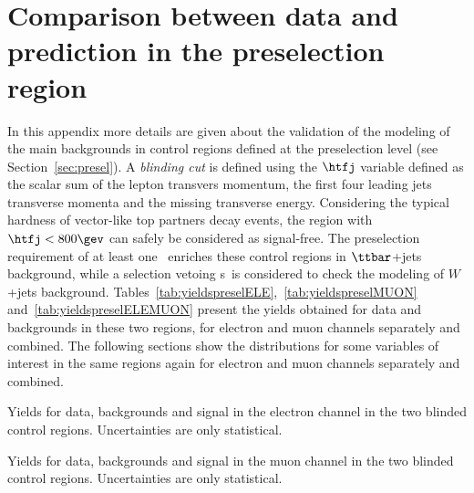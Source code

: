 \clearpage{\pagestyle{empty}\cleardoublepage}

\chapter{Comparison between data and prediction in the preselection region}
\label{app:datamcpresel}

In this appendix more details are given about the 
validation of the modeling of the main backgrounds in
control regions defined at the preselection level 
(see Section~\ref{sec:presel}). A {\it blinding cut}
is defined using the $\htfj$ variable defined as the scalar sum of the
lepton transvers momentum, the first four leading jets transverse momenta
and the missing transverse energy. Considering the typical hardness of
vector-like top partners decay events, the region with $\htfj<800\gev$ can
safely be considered as signal-free. 
The preselection requirement of at least one \bjet\ enriches these control
regions in $\ttbar$+jets background, while  a selection vetoing \bjet s\
is considered to check the modeling of $W$+jets background.
Tables~\ref{tab:yieldspreselELE},~\ref{tab:yieldspreselMUON} and~\ref{tab:yieldspreselELEMUON}
present the yields obtained for data and backgrounds in these two regions,
for electron and muon channels separately and combined.
The following sections show the distributions for some variables of interest
in the same regions again for electron and muon channels separately and combined.

\begin{table}[htb]\centering
        
\caption{Yields for data, backgrounds and signal in the electron channel in the two blinded control
                regions. Uncertainties are only statistical.}\label{tab:yieldspreselELE}
\end{table}

\begin{table}[htb]\centering
        
\caption{Yields for data, backgrounds and signal in the muon  channel in the two blinded control
                regions. Uncertainties are only statistical.}\label{tab:yieldspreselMUON}
\end{table}

